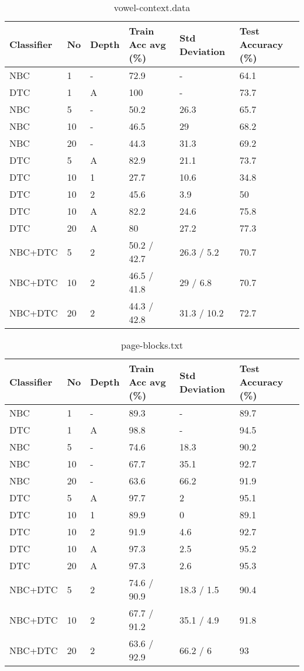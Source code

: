 \begin{table}[h]
	\centering
	\begin{tabular}[h]{l|l|l|l|l|l}
		Classifier & No & Depth & Train Acc avg (\%) & Std Deviation & Test Accuracy (\%)\\
		\hline
		NBC & 1 & -  & 72.9 & - & 64.1 \\
		DTC & 1 & A  & 100 & - & 73.7 \\
		NBC & 5 & -  & 50.2 & 26.3 & 65.7 \\
		NBC & 10 & -  & 46.5 & 29 & 68.2 \\
		NBC & 20 &  - & 44.3 & 31.3 & 69.2 \\
		DTC & 5 & A  & 82.9 & 21.1 & 73.7 \\
		DTC & 10 & 1  & 27.7 & 10.6 & 34.8 \\
		DTC & 10 & 2  & 45.6 & 3.9 & 50 \\
		DTC & 10 & A  & 82.2 & 24.6 & 75.8 \\
		DTC & 20 & A  & 80 & 27.2 & 77.3 \\
		NBC+DTC & 5 & 2  & 50.2 / 42.7 & 26.3 / 5.2 & 70.7 \\
		NBC+DTC & 10 & 2  & 46.5 / 41.8 & 29 / 6.8 & 70.7 \\
		NBC+DTC & 20 & 2  & 44.3 / 42.8 & 31.3 / 10.2 & 72.7 \\
	\end{tabular}
	\caption{vowel-context.data}
\end{table}

\begin{table}[h]
	\centering
	\begin{tabular}[h]{l|l|l|l|l|l}
		Classifier & No & Depth & Train Acc avg (\%) & Std Deviation & Test Accuracy (\%)\\
		\hline
		NBC & 1 & -  & 89.3 & - & 89.7 \\
		DTC & 1 & A  & 98.8 & - & 94.5 \\
		NBC & 5 & -  & 74.6 & 18.3 & 90.2 \\
		NBC & 10 & -  & 67.7 & 35.1 & 92.7 \\
		NBC & 20 & -  & 63.6 & 66.2 & 91.9 \\
		DTC & 5 & A  & 97.7 & 2 & 95.1 \\
		DTC & 10 & 1  & 89.9 & 0 & 89.1 \\
		DTC & 10 & 2  & 91.9 & 4.6 & 92.7 \\
		DTC & 10 & A  & 97.3 & 2.5 & 95.2 \\
		DTC & 20 & A  & 97.3 & 2.6 & 95.3 \\
		NBC+DTC & 5 & 2  & 74.6 / 90.9 & 18.3 / 1.5 & 90.4 \\
		NBC+DTC & 10 & 2  & 67.7 / 91.2 & 35.1 / 4.9 & 91.8 \\
		NBC+DTC & 20 & 2  & 63.6 / 92.9 & 66.2 / 6 & 93 \\
	\end{tabular}
	\caption{page-blocks.txt}
\end{table}

